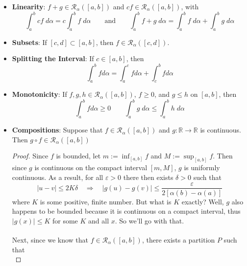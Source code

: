 \documentclass[12pt]{article}
\theoremstyle{plain}
\theoremstyle{definition}
\theoremstyle{remark}
\begin{document}
\begin{itemize}
    \item \textbf{Linearity}: $f+g \in \mathscr{R}_\alpha([a,b])$
        and $cf \in \mathscr{R}_\alpha([a,b])$, with 
        \[ \int^b_a cf \; d\alpha = c \int^b_a f\; d\alpha  
            \qquad \text{and} \qquad 
            \int^b_a f+g\; d\alpha = \int^b_a f \;d\alpha + 
            \int^b_a g\; d\alpha 
        \]
    \item \textbf{Subsets}: If $[c,d]\subset[a,b]$, then $f \in \mathscr{R}_\alpha([c,d])$.
    \item \textbf{Splitting the Interval}: If $c \in [a,b]$, then 
        \[ \int^b_a f d\alpha = \int^c_a f d\alpha 
            + \int^b_c f d\alpha \]
    \item \textbf{Monotonicity}: If $f,g,h \in 
        \mathscr{R}_\alpha([a,b])$, $f\geq0$, and
        $g \leq h$ on $[a,b]$, then
            \[ \int^b_a f d\alpha \geq 0 \qquad
                \int^b_a g \; d\alpha \leq 
                \int^b_a h \; d\alpha  \]
    \item \textbf{Compositions}: Suppose that $f \in 
        \mathscr{R}_\alpha([a,b])$ and
        $g: \mathbb{R}\rightarrow\mathbb{R}$ is 
        continuous. Then $g \circ f\in\mathscr{R}_\alpha([a,b])$
        \begin{proof}
            Since $f$ is bounded, 
            let $m:=\inf_{[a,b]}f$ and $M:=\sup_{[a,b]}f$.
            Then since $g$ is continuous on the compact 
            interval $[m,M]$, $g$ is uniformly continuous.
            As a result, for all $\varepsilon>0$
            there then exists $\delta>0$ such that 
            \begin{equation}
                \label{cont}
                 |u- v| \leq 2K\delta \quad \Rightarrow
                    \quad |g(u) - g(v)| \leq 
                    \frac{\varepsilon}{2\left[\alpha(b)-\alpha(a)
                    \right]}
            \end{equation}
            where $K$ is some positive, finite number. But what
            is $K$ exactly? Well,
            $g$ also happens to be bounded because it is
            continuous on a compact interval, thus $|g(x)| \leq K$
            for some $K$ and all $x$. So we'll go with that.
            \\
            \\
            Next, since we know that $f \in 
            \mathscr{R}_\alpha([a,b])$, 
            there exists a partition $P$ such that
            \begin{equation}

\end{equation}
\end{proof}
\end{itemize}
\end{document}
